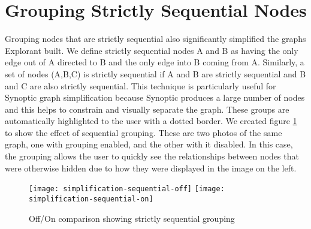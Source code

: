 \section{Grouping Strictly Sequential Nodes}
Grouping nodes that are strictly sequential also significantly simplified the graphs Explorant built. We define strictly sequential nodes A and B as having the only edge out of A directed to B and the only edge into B coming from A. Similarly, a set of nodes (A,B,C) is strictly sequential if A and B are strictly sequential and B and C are also strictly sequential. This technique is particularly useful for Synoptic graph simplification because Synoptic produces a large number of nodes and this helps to constrain and visually separate the graph. These groups are automatically highlighted to the user with a dotted border. We created figure \ref{fig:seq-on-off} to show the effect of sequential grouping. These are two photos of the same graph, one with grouping enabled, and the other with it disabled. In this case, the grouping allows the user to quickly see the relationships between nodes that were otherwise hidden due to how they were displayed in the image on the left.


\begin{figure}[!ht]
\centering
\texttt{[image: simplification-sequential-off]}
\texttt{[image: simplification-sequential-on]}
\caption{Off/On comparison showing strictly sequential grouping}
    \label{fig:seq-on-off}
\end{figure}
